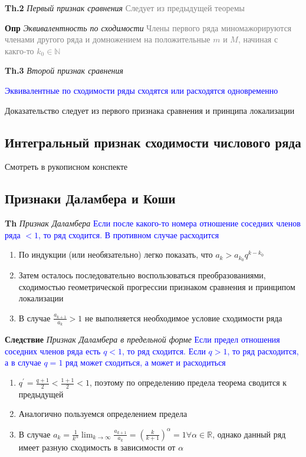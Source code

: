 \textbf{Th.2} \textit{Первый признак сравнения} \textcolor{gray}{Следует из предыдущей теоремы}

\textbf{Опр} \textit{Эквивалентность по сходимости} \textcolor{gray}{Члены первого ряда миномажорируются членами
другого ряда и домножением на положительные $m$ и $M$, начиная с какго-то $k_0 \in \mathbb{N}$}

\textbf{Th.3} \textit{Второй признак сравнения}

\textcolor{blue}{Эквивалентные по сходимости ряды сходятся или
расходятся одновременно}

Доказательство следует из первого признака сравнения и принципа локализации

\subsection{Интегральный признак сходимости числового ряда}

Смотреть в рукописном конспекте

\subsection{Признаки Даламбера и Коши}

\textbf{Th} \textit{Признак Даламбера} \textcolor{blue}{Если после какого-то номера отношение соседних членов
ряда $< 1$, то ряд сходится. В противном случае расходится}

\begin{enumerate}
    \item По индукции (или необязательно) легко показать, что $a_k > a_{k_0} q^{k - k_0}$
    \item Затем осталось последовательно воспользоваться преобразованиями, сходимостью геометрической прогрессии
    признаком сравнения и принципом локализации
    \item В случае $\frac{a_{k+1}}{a_k} > 1$ не выполняется необходимое условие сходимости ряда
\end{enumerate}

\textbf{Следствие} \textit{Признак Даламбера в предельной форме} \textcolor{blue}{Если предел отношения соседних
членов ряда есть $q < 1$, то ряд сходится. Если $q > 1$, то ряд расходится, а в случае $q = 1$ ряд может
сходиться, а может и расходиться}

\begin{enumerate}
    \item $q^{'} = \frac{q+1}{2} < \frac{1 + 1}{2} < 1$, поэтому по определению предела теорема сводится к
    предыдущей
    \item Аналогично пользуемся определением предела
    \item В случае $a_k = \frac{1}{k^{\alpha}} \lim_{k\to\infty} \frac{a_{k+1}}{a_k} = \left(\frac{k}{k+1}\right)^{\alpha} = 1
    \forall \alpha \in \mathbb{R}$, однако данный ряд имеет разную сходимость в зависимости от $\alpha$
\end{enumerate}


